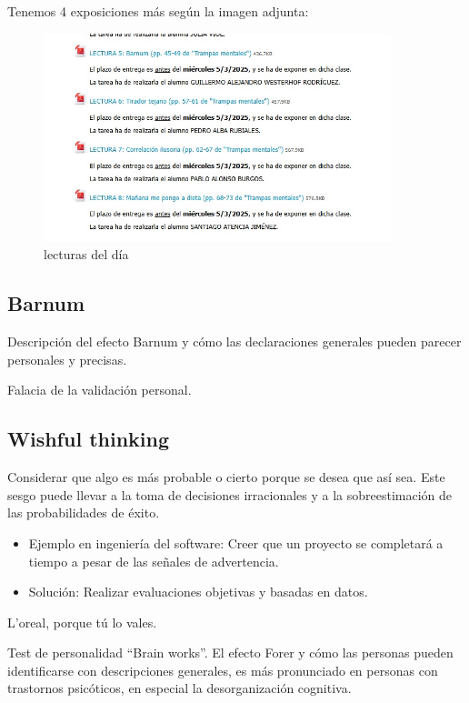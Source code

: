 \documentclass[12pt, a4paper, twoside]{article}
\begin{document}
Tenemos 4 exposiciones más según la imagen adjunta:
\begin{figure}[h]
    \centering
    \includegraphics[width=0.9\textwidth]{./Images/0305.jpg}
    \caption{lecturas del día}
\end{figure}

\subsection{Barnum}
Descripción del efecto Barnum y cómo las declaraciones generales pueden parecer personales y precisas.

Falacia de la validación personal.

\subsection{Wishful thinking}
Considerar que algo es más probable o cierto porque se desea que así sea. Este sesgo puede llevar a la toma de decisiones irracionales y a la sobreestimación de las probabilidades de éxito.

\begin{itemize}
    \item{Ejemplo en ingeniería del software: Creer que un proyecto se completará a tiempo a pesar de las señales de advertencia.}
    \item{Solución: Realizar evaluaciones objetivas y basadas en datos.}
\end{itemize}

L'oreal, porque tú lo vales.\newline

Test de personalidad ``Brain works''. El efecto Forer y cómo las personas pueden identificarse con descripciones generales, es más pronunciado en 
personas con trastornos psicóticos, en especial la desorganización cognitiva.
\end{document}
